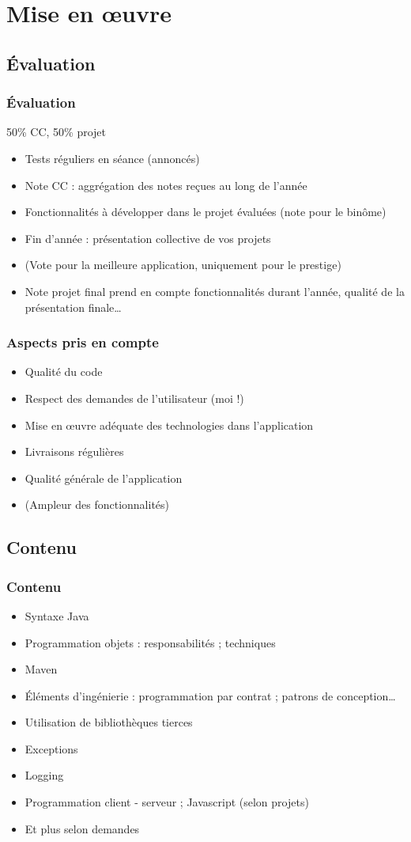 \documentclass[english, french]{beamer}
\begin{document}
\section{Mise en œuvre}
\subsection{Évaluation}
\begin{frame}
	\frametitle{Évaluation}
	50\% CC, 50\% projet
	\begin{itemize}
		\item Tests réguliers en séance (annoncés)
		\item Note CC : aggrégation des notes reçues au long de l’année
		\item Fonctionnalités à développer dans le projet évaluées (note pour le binôme)
		\item Fin d’année : présentation collective de vos projets
		\item (Vote pour la meilleure application, uniquement pour le prestige)
		\item Note projet final prend en compte fonctionnalités durant l’année, qualité de la présentation finale…
	\end{itemize}
\end{frame}

\begin{frame}
	\frametitle{Aspects pris en compte}
	\begin{itemize}
		\item Qualité du code 
		\item Respect des demandes de l’utilisateur (moi !)
		\item Mise en œuvre adéquate des technologies dans l’application
		\item Livraisons régulières
		\item Qualité générale de l’application
		\item (Ampleur des fonctionnalités)
	\end{itemize}
\end{frame}

\subsection{Contenu}
\begin{frame}
	\frametitle{Contenu}
	\begin{itemize}
		\item Syntaxe Java
		\item Programmation objets : responsabilités ; techniques
		\item Maven
		\item Éléments d’ingénierie : programmation par contrat ; patrons de conception…
		\item Utilisation de bibliothèques tierces
		\item Exceptions
		\item Logging
		\item Programmation client - serveur ; Javascript (selon projets)
		\item Et plus selon demandes
	\end{itemize}
\end{frame}
\end{document}
